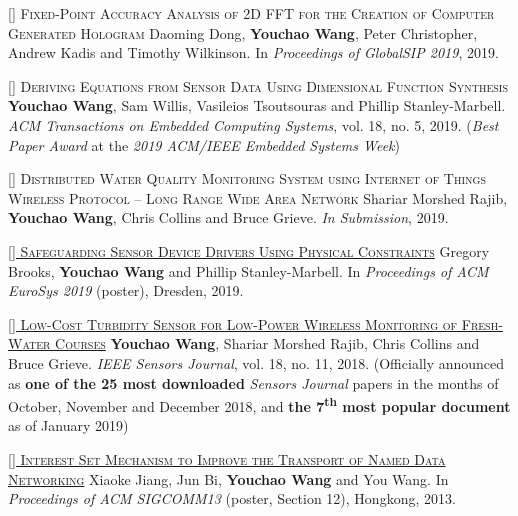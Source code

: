 \documentclass[11pt,a4paper]{moderncv}
\begin{document}
\textsc{[] Fixed-Point Accuracy Analysis of 2D FFT for the Creation of Computer Generated Hologram}
\newline  Daoming Dong, \textbf{Youchao Wang}, Peter Christopher, Andrew Kadis and Timothy Wilkinson. In \textit{Proceedings of GlobalSIP 2019}, 2019.

\addtocounter{counter}{1}

\textsc{[] Deriving Equations from Sensor Data Using Dimensional Function Synthesis}
\newline  \textbf{Youchao Wang}, Sam Willis, Vasileios Tsoutsouras and Phillip Stanley-Marbell. \textit{ACM Transactions on Embedded Computing Systems}, vol. 18, no. 5, 2019. (\textit{Best Paper Award} at the \textit{2019 ACM/IEEE Embedded Systems Week})

\addtocounter{counter}{1}

\textsc{[] Distributed Water Quality Monitoring System using Internet of Things Wireless Protocol – Long Range Wide Area Network}
\newline  Shariar Morshed Rajib, \textbf{Youchao Wang}, Chris Collins and Bruce Grieve. \textit{In Submission}, 2019.

\addtocounter{counter}{1}

\href{https://www.eurosys2019.org/wp-content/uploads/2019/03/eurosys19posters-abstract77.pdf}{\textsc{[] Safeguarding Sensor Device Drivers Using Physical Constraints}}
\newline  Gregory Brooks, \textbf{Youchao Wang} and Phillip Stanley-Marbell. In \textit{Proceedings of ACM EuroSys 2019} (poster), Dresden, 2019.

\addtocounter{counter}{1}

\href{https://ieeexplore.ieee.org/document/8337739}{\textsc{[] Low-Cost Turbidity Sensor for Low-Power Wireless Monitoring of Fresh-Water Courses}}
\newline  \textbf{Youchao Wang}, Shariar Morshed Rajib, Chris Collins and Bruce Grieve. \textit{IEEE Sensors Journal}, vol. 18, no. 11, 2018. (Officially announced as \textbf{one of the 25 most downloaded} \textit{Sensors Journal} papers in the months of October, November and December 2018, and \textbf{the 7\textsuperscript{th} most popular document} as of January 2019)

\addtocounter{counter}{1}

\href{https://ndnsim.net/2.3/ndnsim-research-papers.html}{\textsc{[] Interest Set Mechanism to Improve the Transport of Named Data Networking}}
\newline  Xiaoke Jiang, Jun Bi, \textbf{Youchao Wang} and You Wang. In \textit{Proceedings of ACM SIGCOMM13} (poster, Section 12), Hongkong, 2013. 
\end{document}
